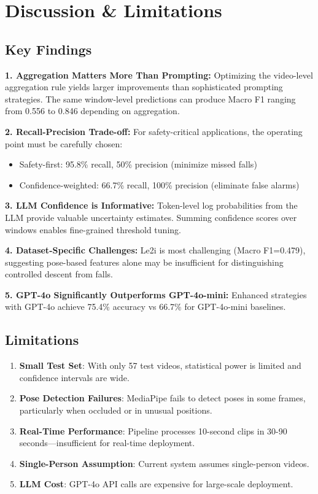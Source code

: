\documentclass[conference]{IEEEtran}
\begin{document}
\section{Discussion \& Limitations}

\subsection{Key Findings}

\textbf{1. Aggregation Matters More Than Prompting:}
Optimizing the video-level aggregation rule yields larger improvements than sophisticated prompting strategies. The same window-level predictions can produce Macro F1 ranging from 0.556 to 0.846 depending on aggregation.

\textbf{2. Recall-Precision Trade-off:}
For safety-critical applications, the operating point must be carefully chosen:
\begin{itemize}[leftmargin=*]
    \item Safety-first: 95.8\% recall, 50\% precision (minimize missed falls)
    \item Confidence-weighted: 66.7\% recall, 100\% precision (eliminate false alarms)
\end{itemize}

\textbf{3. LLM Confidence is Informative:}
Token-level log probabilities from the LLM provide valuable uncertainty estimates. Summing confidence scores over windows enables fine-grained threshold tuning.

\textbf{4. Dataset-Specific Challenges:}
Le2i is most challenging (Macro F1=0.479), suggesting pose-based features alone may be insufficient for distinguishing controlled descent from falls.

\textbf{5. GPT-4o Significantly Outperforms GPT-4o-mini:}
Enhanced strategies with GPT-4o achieve 75.4\% accuracy vs 66.7\% for GPT-4o-mini baselines.

\subsection{Limitations}

\begin{enumerate}[leftmargin=*]
    \item \textbf{Small Test Set}: With only 57 test videos, statistical power is limited and confidence intervals are wide.
    
    \item \textbf{Pose Detection Failures}: MediaPipe fails to detect poses in some frames, particularly when occluded or in unusual positions.
    
    \item \textbf{Real-Time Performance}: Pipeline processes 10-second clips in 30-90 seconds—insufficient for real-time deployment.
    
    \item \textbf{Single-Person Assumption}: Current system assumes single-person videos.
    
    \item \textbf{LLM Cost}: GPT-4o API calls are expensive for large-scale deployment.
\end{enumerate}
\end{document}
